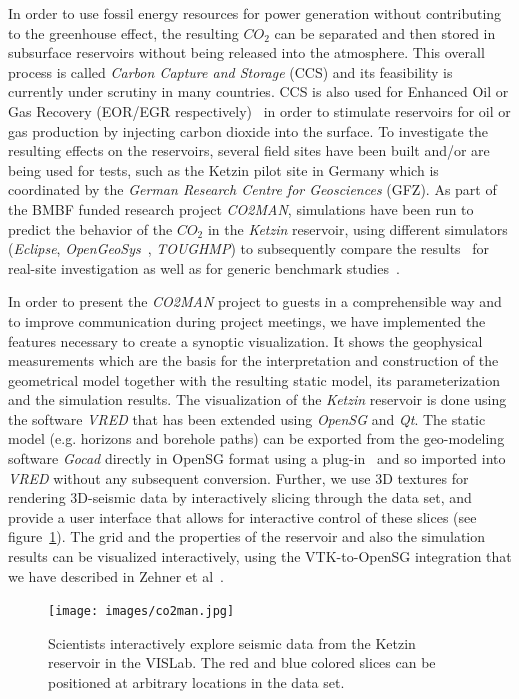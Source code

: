 \documentclass[twocolumn]{svjour3}          %
\begin{document}
In order to use fossil energy resources for power generation without contributing to the greenhouse effect, the resulting $CO_{2}$ can be separated and then stored in subsurface reservoirs without being released into the atmosphere. This overall process is called \emph{Carbon Capture and Storage} (CCS) and its feasibility is currently under scrutiny in many countries. CCS is also used for Enhanced Oil or Gas Recovery (EOR/EGR respectively)~\cite{Singh20113446} in order to stimulate reservoirs for oil or gas production by injecting carbon dioxide into the surface. To investigate the resulting effects on the reservoirs, several field sites have been built and/or are being used for tests, such as the Ketzin pilot site in Germany which is coordinated by the \emph{German Research Centre for Geosciences} (GFZ). As part of the BMBF funded research project \emph{CO2MAN}, simulations have been run to predict the behavior of the $CO_{2}$ in the \emph{Ketzin} reservoir, using different simulators (\emph{Eclipse}, \emph{OpenGeoSys}~\cite{Wang2014}, \emph{TOUGHMP}) to subsequently compare the results~\cite{Kempka2013418} for real-site investigation as well as for generic benchmark studies~\cite{Kolditz2012613}.

In order to present the \emph{CO2MAN} project to guests in a comprehensible way and to improve communication during project meetings, we have implemented the features necessary to create a synoptic visualization. It shows the geophysical measurements which are the basis for the interpretation and construction of the geometrical model together with the resulting static model, its parameterization and the simulation results. The visualization of the \emph{Ketzin} reservoir is done using the software \emph{VRED} that has been extended using \emph{OpenSG} and \emph{Qt}. The static model (e.g. horizons and borehole paths) can be exported from the geo-modeling software \emph{Gocad} directly in OpenSG format using a plug-in~\cite{zehner:gocad} and so imported into \emph{VRED} without any subsequent conversion. Further, we use 3D textures for rendering 3D-seismic data by interactively slicing through the data set, and provide a user interface that allows for interactive control of these slices (see figure~\ref{fig:co2man}). The grid and the properties of the reservoir and also the simulation results can be visualized interactively, using the VTK-to-OpenSG integration that we have described in Zehner et al~\cite{zehner:uncertainty}.

\begin{figure}[htb]
  \texttt{[image: images/co2man.jpg]}
\caption{Scientists interactively explore seismic data from the Ketzin reservoir in the VISLab. The red and blue colored slices can be positioned at arbitrary locations in the data set.}
\label{fig:co2man}
\end{figure}
\end{document}
